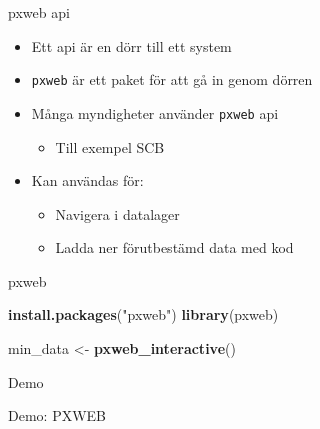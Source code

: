 \documentclass[
  11pt,
  ignorenonframetext,
  handout]{beamer}
\newenvironment{Shaded}{\begin{snugshade}}{\end{snugshade}}
\newcommand{\FunctionTok}[1]{\textcolor[rgb]{0.13,0.29,0.53}{\textbf{#1}}}
\newcommand{\NormalTok}[1]{#1}
\newcommand{\OtherTok}[1]{\textcolor[rgb]{0.56,0.35,0.01}{#1}}
\newcommand{\StringTok}[1]{\textcolor[rgb]{0.31,0.60,0.02}{#1}}
\providecommand{\tightlist}{%
  \setlength{\itemsep}{0pt}\setlength{\parskip}{0pt}}
\begin{document}
\begin{frame}{pxweb api}
\label{pxweb-api}
\begin{itemize}
\tightlist
\item
  Ett api är en dörr till ett system
\item
  \texttt{pxweb} är ett paket för att gå in genom dörren
\item
  Många myndigheter använder \texttt{pxweb} api

  \begin{itemize}
  \tightlist
  \item
    Till exempel SCB
  \end{itemize}
\item
  Kan användas för:

  \begin{itemize}
  \tightlist
  \item
    Navigera i datalager
  \item
    Ladda ner förutbestämd data med kod
  \end{itemize}
\end{itemize}
\end{frame}

\begin{frame}[fragile]{pxweb}
\label{pxweb}
\begin{Shaded}
\begin{Highlighting}[]
\FunctionTok{install.packages}\NormalTok{(}\StringTok{"pxweb"}\NormalTok{)}
\FunctionTok{library}\NormalTok{(pxweb)}

\NormalTok{min\_data }\OtherTok{\textless{}{-}} \FunctionTok{pxweb\_interactive}\NormalTok{()}
\end{Highlighting}
\end{Shaded}
\end{frame}

\begin{frame}{Demo}
\label{demo-3}
\begin{block}{Demo: PXWEB}
\label{demo-pxweb}
\end{block}
\end{frame}
\end{document}
